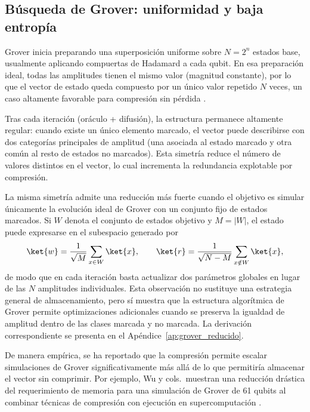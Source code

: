 \subsection{Búsqueda de Grover: uniformidad y baja entropía}
\label{subsec:patrones_grover}

Grover inicia preparando una superposición uniforme sobre $N=2^n$ estados base, usualmente aplicando compuertas de Hadamard a cada qubit. En esa preparación ideal, todas las amplitudes tienen el mismo valor (magnitud constante), por lo que el vector de estado queda compuesto por un único valor repetido $N$ veces, un caso altamente favorable para compresión sin pérdida \cite{Grover1996, Szablowski2021}.

Tras cada iteración (oráculo + difusión), la estructura permanece altamente regular: cuando existe un único elemento marcado, el vector puede describirse con dos categorías principales de amplitud (una asociada al estado marcado y otra común al resto de estados no marcados). Esta simetría reduce el número de valores distintos en el vector, lo cual incrementa la redundancia explotable por compresión.

La misma simetría admite una reducción más fuerte cuando el objetivo es simular únicamente la evolución ideal de Grover con un conjunto fijo de estados marcados. Si $W$ denota el conjunto de estados objetivo y $M=|W|$, el estado puede expresarse en el subespacio generado por
\[
\ket{w}=\frac{1}{\sqrt{M}}\sum_{x\in W}\ket{x},
\qquad
\ket{r}=\frac{1}{\sqrt{N-M}}\sum_{x\notin W}\ket{x},
\]
de modo que en cada iteración basta actualizar dos parámetros globales en lugar de las $N$ amplitudes individuales. Esta observación no sustituye una estrategia general de almacenamiento, pero sí muestra que la estructura algorítmica de Grover permite optimizaciones adicionales cuando se preserva la igualdad de amplitud dentro de las clases marcada y no marcada. La derivación correspondiente se presenta en el Apéndice~\ref{ap:grover_reducido}.

De manera empírica, se ha reportado que la compresión permite escalar simulaciones de Grover significativamente más allá de lo que permitiría almacenar el vector sin comprimir. Por ejemplo, Wu y cols.\ muestran una reducción drástica del requerimiento de memoria para una simulación de Grover de 61 qubits al combinar técnicas de compresión con ejecución en supercomputación \cite{wu2019full}.
